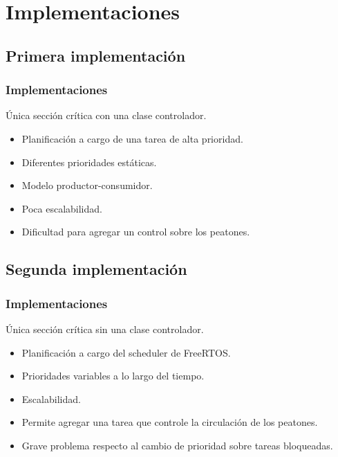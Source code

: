 \section{Implementaciones}

\subsection{Primera implementación}

\begin{frame}
\frametitle{Implementaciones}
\begin{block}{Única sección crítica con una clase controlador.}
	\begin{itemize}
		\item Planificación a cargo de una tarea de alta prioridad.
		\item Diferentes prioridades estáticas.
		\item Modelo productor-consumidor.
		\item Poca escalabilidad.
		\item Dificultad para agregar un control sobre los peatones.
	\end{itemize}
\end{block}
\end{frame}

\subsection{Segunda implementación}
\begin{frame}
\frametitle{Implementaciones}
\begin{block}{Única sección crítica sin una clase controlador.}
	\begin{itemize}
		\item Planificación a cargo del scheduler de FreeRTOS.
		\item Prioridades variables a lo largo del tiempo.
		\item Escalabilidad.
		\item Permite agregar una tarea que controle la circulación de los peatones.
		\item Grave problema respecto al cambio de prioridad sobre tareas bloqueadas.
	\end{itemize}
\end{block}
\end{frame}

